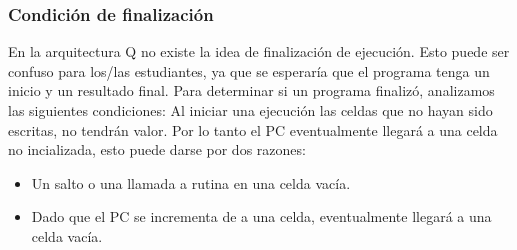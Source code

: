 \subsubsection{Condición de finalización}

En la arquitectura Q no existe la idea de finalización de ejecución. Esto puede ser confuso para los/las estudiantes, ya que se esperaría que el programa tenga un inicio y 
un resultado final. 
Para determinar si un programa finalizó, analizamos las siguientes condiciones: 
Al iniciar una ejecución las celdas que no hayan sido escritas, no tendrán valor. Por lo tanto el PC eventualmente llegará a una celda no incializada, esto puede darse por dos 
razones:
\begin{itemize}
  \item Un salto o una llamada a rutina en una celda vacía.
  \item Dado que el PC se incrementa de a una celda, eventualmente llegará a una celda vacía.
\end{itemize}

